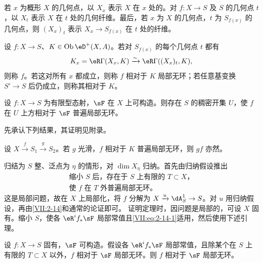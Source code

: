 \subsection{}\label{VII:2-11}
若 $x$ 为概形 $X$ 的几何点，以 $X_x$ 表示 $X$ 在 $x$ 处的。对 $f:X\to S$ 及 $S$ 的几何点 $t$，以 $X_t$ 表示 $X$ 在 $t$ 处的几何纤维。最后，若 $x$ 为 $X$ 的几何点，$t$ 为 $S_{f(x)}$ 的几何点，则 $(X_x)_t$ 表示 $X_x\to S_{f(x)}$ 在 $t$ 处的纤维。
\begin{definition_}\label{VII:2-12}
设 $f:X\to S$、$K\in\ob\eD^+(X,A)$。若对 $S_{f(x)}$ 的每个几何点 $t$ 都有
\[
 K_x=\eR\Gamma(X_x,K)\iso\eR\Gamma((X_x)_t,K),
\]
则称 $f$。若这对所有 $x$ 都成立，则称 $f$ 相对于 $K$ 局部无环；若任意基变换 $S'\to S$ 后仍成立，则称其相对于 $K$。
\end{definition_}
\begin{theorem_}\label{VII:2-13}
设 $f:X\to S$ 为有限型态射，$\sF$ 在 $X$ 上可构造。则存在 $S$ 的稠密开集 $U$，使 $f$ 在 $U$ 上方相对于 $\sF$ 普遍局部无环。
\end{theorem_}
先承认下列结果，其证明见附录。
\begin{lemma_}\label{VII:2-14}
设 $X\xrightarrow fS_1\xrightarrow gS_2$。若 $g$ 光滑，$f$ 相对于 $K$ 普遍局部无环，则 $gf$ 亦然。
\end{lemma_}
归结为 $S$ 整、泛点为 $\eta$ 的情形，对 $\dim X_\eta$ 归纳。首先由归纳假设推出
\begin{equation*}\tag{A}\label{VII:eq:2-14-1}
 \begin{gathered}
 \text{缩小 $S$ 后，存在于 $S$ 上有限的 $T\subset X$，}\\
 \text{使 $f$ 在 $T$ 外普遍局部无环。}
 \end{gathered}
\end{equation*}
这是局部问题，故在 $X$ 上局部化，将 $f$ 分解为 $X\xrightarrow u\dA_S^1\to S$。对 $u$ 用归纳假设，再由\ref{VII:2-14}和通常的论证即可。
证明定理时，因问题是局部的，可设 $X$ 固有。缩小 $S$，使各 $\eR^i f_\ast\sF$ 局部常值且\eqref{VII:eq:2-14-1}适用，然后使用下述引理。
\begin{lemma_}\label{VII:2-15}
设 $f:X\to S$ 固有，$\sF$ 可构造。假设各 $\eR^i f_\ast\sF$ 局部常值，且除某个在 $S$ 上有限的 $T\subset X$ 以外，$f$ 相对于 $\sF$ 局部无环。则 $f$ 相对于 $\sF$ 局部无环。
\end{lemma_}
